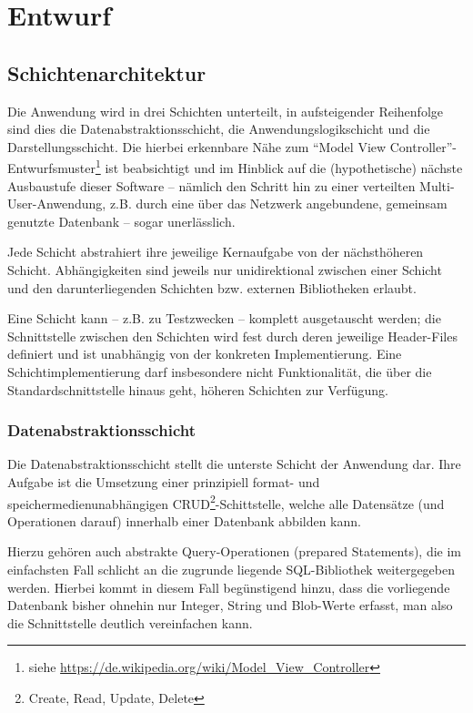 \section{Entwurf}
\subsection{Schichtenarchitektur}
Die Anwendung wird in drei Schichten unterteilt, in aufsteigender Reihenfolge sind
dies die Datenabstraktionsschicht, die Anwendungslogikschicht und die Darstellungsschicht. Die
hierbei erkennbare Nähe zum ``Model View Controller''-Entwurfsmuster\footnote{siehe
\url{https://de.wikipedia.org/wiki/Model_View_Controller}} ist beabsichtigt und
im Hinblick auf die (hypothetische) nächste Ausbaustufe dieser Software --
nämlich den Schritt hin zu einer verteilten Multi-User-Anwendung, z.B. durch eine
über das Netzwerk angebundene, gemeinsam genutzte Datenbank -- sogar unerlässlich.

Jede Schicht abstrahiert ihre jeweilige Kernaufgabe von der nächsthöheren Schicht.
Abhängigkeiten sind jeweils nur unidirektional zwischen einer Schicht und
den darunterliegenden Schichten bzw. externen Bibliotheken erlaubt.

Eine Schicht kann -- z.B. zu Testzwecken -- komplett ausgetauscht werden; die
Schnittstelle zwischen den Schichten wird fest durch deren jeweilige Header-Files
definiert und ist unabhängig von der konkreten Implementierung. Eine
Schichtimplementierung darf insbesondere nicht Funktionalität, die über die
Standardschnittstelle hinaus geht, höheren Schichten zur Verfügung.

\subsubsection{Datenabstraktionsschicht}
\label{datenabstraktionsschicht}
Die Datenabstraktionsschicht stellt die unterste Schicht der Anwendung dar.
Ihre Aufgabe ist die Umsetzung einer prinzipiell format- und speichermedienunabhängigen
CRUD\footnote{Create, Read, Update, Delete}-Schittstelle, welche alle Datensätze
(und Operationen darauf) innerhalb einer Datenbank abbilden kann.

Hierzu gehören auch abstrakte Query-Operationen (prepared Statements), die im
einfachsten Fall schlicht an die zugrunde liegende SQL-Bibliothek weitergegeben
werden. Hierbei kommt in diesem Fall begünstigend hinzu, dass die vorliegende Datenbank
bisher ohnehin nur Integer, String und Blob-Werte erfasst, man also die Schnittstelle deutlich
vereinfachen kann.


